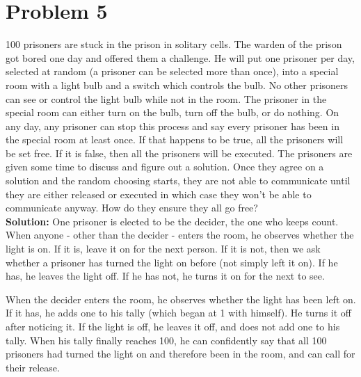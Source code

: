 \documentclass{article}
\providecommand{\soln}{\textbf{Solution: }}
\begin{document}
    \section*{Problem 5}
    100 prisoners are stuck in the prison in solitary cells. The warden of the prison
    got bored one day and offered them a challenge. He will put one prisoner per day,
    selected at random (a prisoner can be selected more than once), into a special
    room with a light bulb and a switch which controls the bulb. No other prisoners
    can see or control the light bulb while not in the room. The prisoner in the special
    room can either turn on the bulb, turn off the bulb, or do nothing. On any day, any prisoner can stop this process and say every prisoner has been in the special
    room at least once. If that happens to be true, all the prisoners will be set free.
    If it is false, then all the prisoners will be executed. The prisoners are given some
    time to discuss and figure out a solution. Once they agree on a solution and the
    random choosing starts, they are not able to communicate until they are either
    released or executed in which case they won't be able to communicate anyway.
    How do they ensure they all go free?\\
    
    \soln One prisoner is elected to be the decider, the one who keeps count. When anyone - other than the decider - enters the room, he observes whether the light is on. If it is, leave it on for the next person. If it is not, then we ask whether a prisoner has turned the light on before (not simply left it on). If he has, he leaves the light off. If he has not, he turns it on for the next to see.
    
    When the decider enters the room, he observes whether the light has been left on. If it has, he adds one to his tally (which began at 1 with himself). He turns it off after noticing it. If the light is off, he leaves it off, and does not add one to his tally. When his tally finally reaches 100, he can confidently say that all 100 prisoners had turned the light on and therefore been in the room, and can call for their release.
\end{document}
